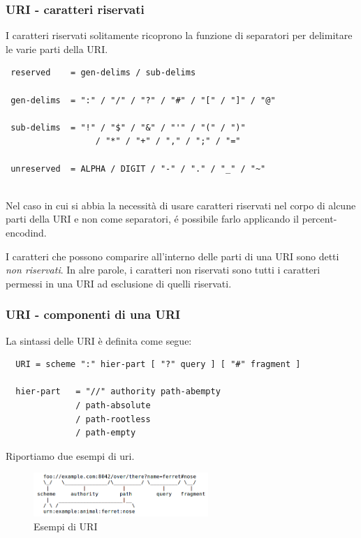 \documentclass[8pt]{beamer}
\begin{document}
\begin{frame}[fragile]
	\frametitle{URI - caratteri riservati}
	
	I caratteri riservati solitamente ricoprono la funzione di 
	separatori per delimitare le varie parti della URI.
	
	\begin{verbatim}
 reserved    = gen-delims / sub-delims
 
 gen-delims  = ":" / "/" / "?" / "#" / "[" / "]" / "@"

 sub-delims  = "!" / "$" / "&" / "'" / "(" / ")"
                  / "*" / "+" / "," / ";" / "=" 
                  
 unreserved  = ALPHA / DIGIT / "-" / "." / "_" / "~"
                  
	\end{verbatim}
	\vspace{\baselineskip}
	
	Nel caso in cui si abbia la necessit\`a di usare caratteri riservati
	nel corpo di alcune parti della URI e non come separatori, \'e possibile
	farlo applicando il percent-encodind.
	\vspace{\baselineskip}

 	I caratteri che possono comparire all'interno delle parti di una URI
 	sono detti \emph{non riservati}. In alre parole, i caratteri non riservati
 	sono tutti i caratteri permessi in una URI ad esclusione di quelli riservati.	
\end{frame}

\begin{frame}[fragile]
	\frametitle{URI - componenti di una URI}
	
	La sintassi delle URI \`e definita come segue:
	
	\begin{verbatim}
  URI = scheme ":" hier-part [ "?" query ] [ "#" fragment ]

  hier-part   = "//" authority path-abempty
              / path-absolute
              / path-rootless
              / path-empty                  
	\end{verbatim}
	\vspace{\baselineskip}
	
	Riportiamo due esempi di uri.
	\vspace{\baselineskip}

	\begin{figure}
	    \includegraphics[width=250px]{imgs/uri-pieces.png}
	    \caption{Esempi di URI}
	\end{figure}
	
\end{frame}
\end{document}

